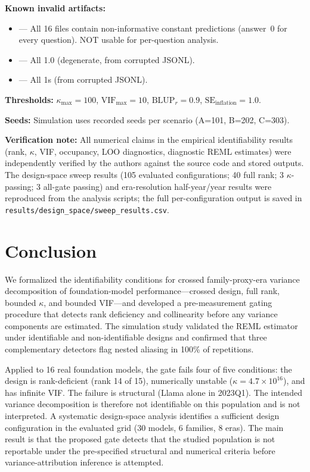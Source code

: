 \documentclass{ieeeaccess}
\theoremstyle{definition}
\theoremstyle{plain}
\begin{document}
\textbf{Known invalid artifacts:}
\begin{itemize}
\item {} --- All 16 files contain non-informative constant predictions (answer~0 for every question). NOT usable for per-question analysis.
\item {} --- All 1.0 (degenerate, from corrupted JSONL).
\item {} --- All 1s (from corrupted JSONL).
\end{itemize}

\textbf{Thresholds:} $\kappa_{\max} = 100$, $\text{VIF}_{\max} = 10$, $\text{BLUP}_{r} = 0.9$, $\text{SE}_{\text{inflation}} = 1.0$.

\textbf{Seeds:} Simulation uses recorded seeds per scenario (A=101, B=202, C=303).

\textbf{Verification note:} All numerical claims in the empirical identifiability results (rank, $\kappa$, VIF, occupancy, LOO diagnostics, diagnostic REML estimates) were independently verified by the authors against the source code and stored outputs. The design-space sweep results (105 evaluated configurations; 40 full rank; 3 $\kappa$-passing; 3 all-gate passing) and era-resolution half-year/year results were reproduced from the analysis scripts; the full per-configuration output is saved in \texttt{results/design\_space/sweep\_results.csv}.

\section{Conclusion}
\label{sec:conclusion}

We formalized the identifiability conditions for crossed family-proxy-era variance decomposition of foundation-model performance---crossed design, full rank, bounded $\kappa$, and bounded VIF---and developed a pre-measurement gating procedure that detects rank deficiency and collinearity before any variance components are estimated. The simulation study validated the REML estimator under identifiable and non-identifiable designs and confirmed that three complementary detectors flag nested aliasing in 100\% of repetitions.

Applied to 16 real foundation models, the gate fails four of five conditions: the design is rank-deficient (rank 14 of 15), numerically unstable ($\kappa = 4.7 \times 10^{16}$), and has infinite VIF. The failure is structural (Llama alone in 2023Q1). The intended variance decomposition is therefore not identifiable on this population and is not interpreted. A systematic design-space analysis identifies a sufficient design configuration in the evaluated grid (30 models, 6 families, 8 eras). The main result is that the proposed gate detects that the studied population is not reportable under the pre-specified structural and numerical criteria before variance-attribution inference is attempted.
\end{document}

